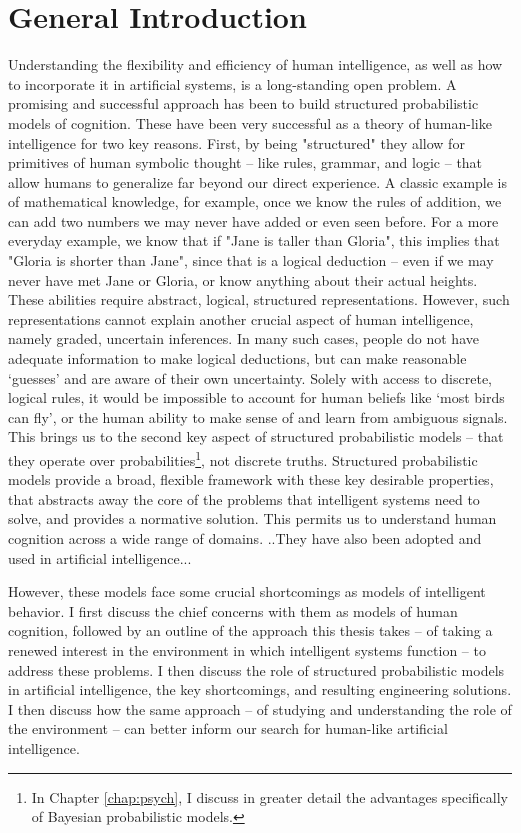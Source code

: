 \chapter{General Introduction}
\label{chap:intro}

Understanding the flexibility and efficiency of human intelligence, as well as how to incorporate it in artificial systems, is a long-standing open problem. A promising and successful approach has been to build structured probabilistic models of cognition. These have been very successful as a theory of human-like intelligence for two key reasons. First, by being "structured" they allow for primitives of human symbolic thought -- like rules, grammar, and logic -- that allow humans to generalize far beyond our direct experience\cite{fodor88, chomsky2002syntactic}. A classic example is of mathematical knowledge, for example, once we know the rules of addition, we can add two numbers we may never have added or even seen before. For a more everyday example, we know that if "Jane is taller than Gloria", this implies that "Gloria is shorter than Jane", since that is a logical deduction -- even if we may never have met Jane or Gloria, or know anything about their actual heights. These abilities require abstract, logical, structured representations. However, such representations cannot explain another crucial aspect of human intelligence, namely graded, uncertain inferences\cite{rogers2004semantic}. In many such cases, people do not have adequate information to make logical deductions, but can make reasonable `guesses' and are aware of their own uncertainty. Solely with access to discrete, logical rules, it would be impossible to account for human beliefs like `most birds can fly', or the human ability to make sense of and learn from ambiguous signals. This brings us to the second key aspect of structured probabilistic models -- that they operate over probabilities\footnote{In Chapter \ref{chap:psych}, I discuss in greater detail the advantages specifically of Bayesian probabilistic models.}, not discrete truths. Structured probabilistic models provide a broad, flexible framework with these key desirable properties, that abstracts away the core of the problems that intelligent systems need to solve, and provides a normative solution. This permits us to understand human cognition across a wide range of domains. ..They have also been adopted and used in artificial intelligence... 

However, these models face some crucial shortcomings as models of intelligent behavior. I first discuss the chief concerns with them as models of human cognition, followed by an outline of the approach this thesis takes -- of taking a renewed interest in the environment in which intelligent systems function -- to address these problems. I then discuss the role of structured probabilistic models in artificial intelligence, the key shortcomings, and resulting engineering solutions. I then discuss how the same approach -- of studying and understanding the role of the environment -- can better inform our search for human-like artificial intelligence.

